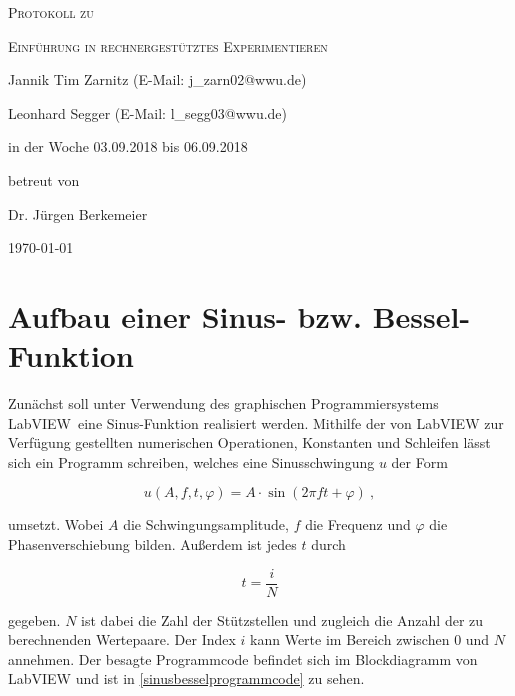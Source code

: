 \documentclass[
a4paper,
12pt,
pagesize,
ngerman
]{scrartcl}
\begin{document}
	
	\begin{titlepage}
		\centering
		{\scshape\LARGE Protokoll zu \par}
		\vspace{1cm}
		{\scshape\huge Einführung in rechnergestütztes Experimentieren \par}
		\vspace{3cm}
		
		{\large Jannik Tim Zarnitz (E-Mail: j\_zarn02@wwu.de) \par}
		{\large Leonhard Segger (E-Mail: l\_segg03@wwu.de) \par}
		\vfill
		
		in der Woche 03.09.2018 bis 06.09.2018\par
		betreut von\par
		{\large Dr. Jürgen Berkemeier}
		
		\vfill
		
		{\large \today\par}
	\end{titlepage}
	\tableofcontents
	\newpage

	
	\section{Aufbau einer Sinus- bzw. Bessel-Funktion} \label{sinusfkt}
	
	Zunächst soll unter Verwendung des graphischen Programmiersystems \glqq LabVIEW\grqq\ eine Sinus-Funktion realisiert werden. Mithilfe der von LabVIEW zur Verfügung gestellten numerischen Operationen, Konstanten und Schleifen lässt sich ein Programm schreiben, welches eine Sinusschwingung $u$ der Form
	
	\begin{equation} \label{u}
	u(A,f,t,\varphi) = A \cdot \sin(2\pi f t + \varphi) \ ,
	\end{equation}
	
	\noindent umsetzt. Wobei $A$ die Schwingungsamplitude, $f$ die Frequenz und $\varphi$ die Phasenverschiebung bilden. Außerdem ist jedes $t$ durch 
	
	\begin{equation} \label{t}
	t = \frac{i}{N}
	\end{equation}
	
	\noindent gegeben. $N$ ist dabei die Zahl der Stützstellen und zugleich die Anzahl der zu berechnenden Wertepaare. Der Index $i$ kann Werte im Bereich zwischen $0$ und $N$ annehmen. Der besagte Programmcode befindet sich im Blockdiagramm von LabVIEW und ist in \cref{sinusbesselprogrammcode} zu sehen. 
	
\end{document}
